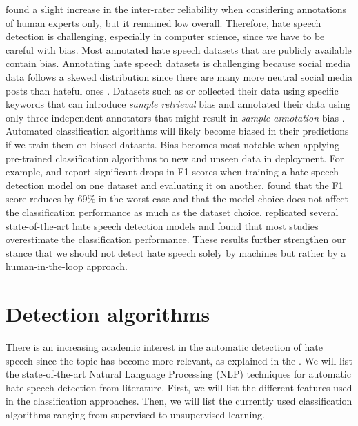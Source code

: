 %
\citet{waseem2016you} found a slight increase in the inter-rater reliability when considering annotations of human experts only, but it remained low overall.
%
%
Therefore, hate speech detection is challenging, especially in computer science, since we have to be careful with bias.
%
Most annotated hate speech datasets that are publicly available contain bias.
%
Annotating hate speech datasets is challenging because social media data follows a skewed distribution since there are many more neutral social media posts than hateful ones \citep{fortuna2018survey}.
%
Datasets such as \citet{waseem2016hateful} or \citet{basile2019semeval} collected their data using specific keywords that can introduce \textit{sample retrieval} bias and annotated their data using only three independent annotators that might result in \textit{sample annotation} bias \citep{balayn2021automatic}.
%
Automated classification algorithms will likely become biased in their predictions if we train them on biased datasets.
%
Bias becomes most notable when applying pre-trained classification algorithms to new and unseen data in deployment.
%
For example, \citet{grondahl2018all} and \citet{arango2019hate} report significant drops in F1 scores when training a hate speech detection model on one dataset and evaluating it on another.
%
\citet{grondahl2018all} found that the F1 score reduces by 69\% in the worst case and that the model choice does not affect the classification performance as much as the dataset choice.
%
\citet{arango2019hate} replicated several state-of-the-art hate speech detection models and found that most studies overestimate the classification performance.
%
These results further strengthen our stance that we should not detect hate speech solely by machines but rather by a human-in-the-loop approach.

\section{Detection algorithms}
There is an increasing academic interest in the automatic detection of hate speech since the topic has become more relevant, as explained in the .
%
We will list the state-of-the-art Natural Language Processing (NLP) techniques for automatic hate speech detection from literature.
%
First, we will list the different features used in the classification approaches.
%
Then, we will list the currently used classification algorithms ranging from supervised to unsupervised learning.
%

